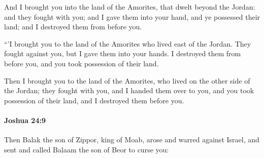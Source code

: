 			\begin{versebox}
					\item[BHS] 
					\item[ASV] And I brought you into the land of the Amorites, that dwelt beyond the Jordan: and they fought with you; and I gave them into your hand, and ye possessed their land; and I destroyed them from before you.
					\item[NIV] “’I brought you to the land of the Amorites who lived east of the Jordan. They fought against you, but I gave them into your hands. I destroyed them from before you, and you took possession of their land.
					\item[NRSV] Then I brought you to the land of the Amorites, who lived on the other side of the Jordan; they fought with you, and I handed them over to you, and you took possession of their land, and I destroyed them before you.
			\end{versebox}

		\paragraph{Joshua 24:9} %
			\label{JOSHUA-24-9}

			Then Balak the son of Zippor, king of Moab, arose and warred against Israel, and sent and called Balaam the son of Beor to curse you:

